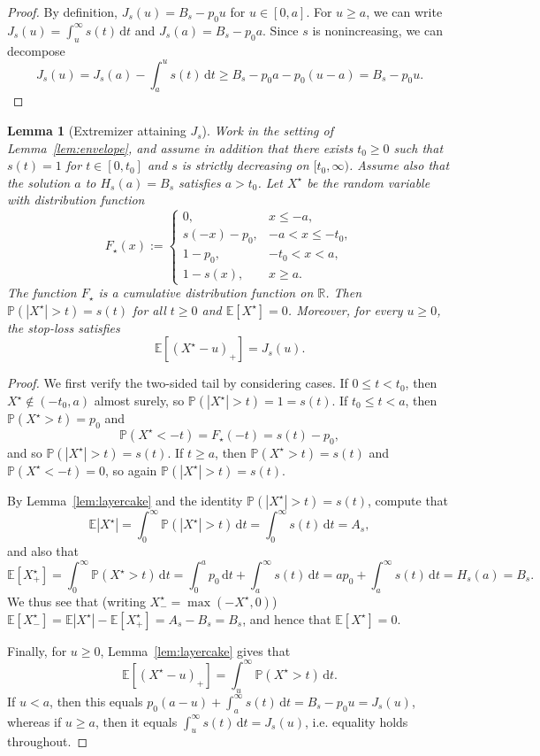 \documentclass[11pt]{article}
\newcommand{\R}{\mathbb{R}}
\newcommand{\Pbb}{\mathbb{P}}
\newcommand{\Ebb}{\mathbb{E}}
\newtheorem{lemma}[theorem]{Lemma}
\begin{document}
\begin{proof}
By definition, $J_s (u) = B_s - p_0 u$ for $u \in [0, a]$. For $u \ge a$, we can write $J_s (u) = \int_u^\infty s(t)\, \mathrm{d}t$ and $J_s (a) = B_s - p_0 a$. Since $s$ is nonincreasing, we can decompose
%
\[
J_s (u) = J_s (a) - \int_a^u s(t) \, \mathrm{d}t \ge B_s -p_0 a - p_0 (u - a) = B_s - p_0 u.
\]
%
\end{proof}

\begin{lemma}[Extremizer attaining $J_s$]\label{lem:extremizer}
Work in the setting of Lemma~\ref{lem:envelope}, and assume in addition that there exists $t_0 \ge 0$ such that $s(t) = 1$ for $t \in [0, t_0]$ and $s$ is strictly decreasing on $[t_0, \infty)$. 
Assume also that the solution $a$ to $H_s (a) = B_s$ satisfies $a > t_0$.
Let $X^\star$ be the random variable with distribution function
%
\[
F_\star(x):=
\begin{cases}
0,& x \le -a,\\[1mm]
s (-x) - p_0, & -a < x \le -t_0,\\[1mm]
1 - p_0, & -t_0 < x < a,\\[1mm]
1 - s (x), & x \ge a.
\end{cases}
\]
%
The function $F_\star$ is a cumulative distribution function on $\R$.
Then $\Pbb( |X^\star| > t) = s (t)$ for all $t \ge 0$ and $\Ebb [X^\star] = 0$. Moreover, for every $u\ge 0$, the stop-loss satisfies
%
\[
\Ebb [ (X^\star - u)_+] = J_s (u).
\]
%
\end{lemma}

\begin{proof}
We first verify the two-sided tail by considering cases. If $0 \le t< t_0$, then $X^\star \notin(-t_0, a)$ almost surely, so
$\Pbb(|X^\star| > t) = 1 = s (t)$. If $t_0 \le t <a$, then $\Pbb(X^\star > t) = p_0$ and
%
\[
\Pbb(X^\star<-t) = F_\star (-t) = s (t) - p_0,
\]
%
and so $\Pbb( |X^\star| > t) = s (t)$. If $t \ge a$, then $\Pbb(X^\star > t) = s(t)$ and $\Pbb(X^\star < -t) = 0$, so again $\Pbb( |X^\star| > t) = s(t)$.

By Lemma~\ref{lem:layercake} and the identity $\Pbb( |X^\star| > t) = s (t)$, compute that
%
\[
\Ebb |X^\star| = \int_0^\infty \Pbb( |X^\star| > t) \, \mathrm{d}t = \int_0^\infty s(t) \, \mathrm{d}t = A_s,
\]
%
and also that
%
\[
\Ebb [X^\star_+] = \int_0^\infty \Pbb(X^\star > t) \, \mathrm{d}t
= \int_0^a p_0 \, \mathrm{d}t + \int_a^\infty s(t) \, \mathrm{d}t
= a p_0 + \int_a^\infty s(t) \, \mathrm{d}t
= H_s(a) = B_s.
\]
%
We thus see that (writing $X^\star_- = \max (-X^\star, 0)$) $\Ebb[X^\star_-]=\Ebb|X^\star|-\Ebb[X^\star_+] = A_s - B_s = B_s$, and hence that $\Ebb [X^\star] = 0$.

Finally, for $u \ge 0$, Lemma~\ref{lem:layercake} gives that
%
\[
\Ebb [(X^\star - u)_+] = \int_u^\infty \Pbb(X^\star > t) \, \mathrm{d}t.
\]
%
If $u < a$, then this equals $p_0 (a - u) + \int_a^\infty s(t) \, \mathrm{d}t = B_s - p_0 u = J_s (u)$, whereas if $u\ge a$, then it equals $\int_u^\infty s(t) \, \mathrm{d}t = J_s (u)$, i.e. equality holds throughout.
\end{proof}
\end{document}
